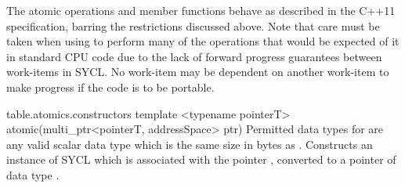
The atomic operations and member functions behave as described in the C++11
specification, barring the restrictions discussed above. Note that care
must be taken when using  to
perform many of the operations that would be expected of it in
standard CPU code due to the lack of forward progress guarantees
between work-items in SYCL. No work-item may be dependent on another
work-item to make progress if the code is to be portable.

{table.atomics.constructors}
  \addRowTwoSL
    { template <typename pointerT> }
    { atomic(multi_ptr<pointerT, addressSpace> ptr) }
    {
      Permitted data types for  are any valid scalar data
      type which is the same size in bytes as . Constructs an
      instance of SYCL  which is associated with the pointer
      , converted to a pointer of data type .
    }
\completeInfoTable

